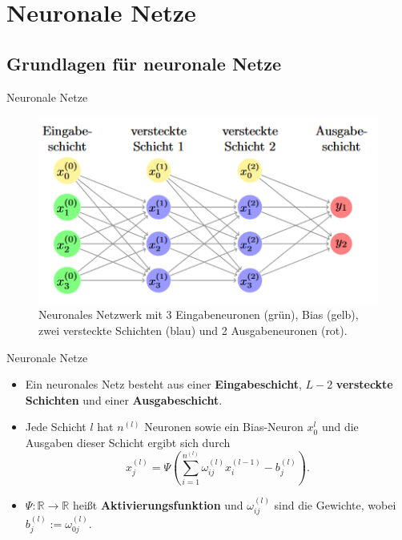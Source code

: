 \section{Neuronale Netze}

\subsection{Grundlagen für neuronale Netze}

\begin{frame}{Neuronale Netze}
    \begin{figure}[htp]
        \centering
        \includegraphics[scale=0.5]{images/neuralnet}
        \caption{Neuronales Netzwerk mit 3 Eingabeneuronen (grün), Bias (gelb), zwei versteckte Schichten
            (blau) und 2 Ausgabeneuronen (rot).}
        \label{neuralNetexample}
    \end{figure}
\end{frame}

\begin{frame}{Neuronale Netze}
    \begin{itemize}
        \item<1-> Ein neuronales Netz besteht aus einer \textbf{Eingabeschicht}, $L-2$ \textbf{versteckte Schichten} und
        einer \textbf{Ausgabeschicht}.
        \item<2-> Jede Schicht $l$ hat $n^{(l)}$ Neuronen sowie ein Bias-Neuron $x_0^{l}$ und die Ausgaben dieser
        Schicht ergibt sich durch
        \[
            x_j^{(l)} = \Psi \left( \sum_{i=1}^{n^{(l)}} \omega_{ij}^{(l)} x_i^{(l-1)} - b_j^{(l)} \right).
        \]
        \item<3-> $\Psi:\mathbb{R} \rightarrow \mathbb{R}$ heißt \textbf{Aktivierungsfunktion} und $\omega_{ij}^{(l)}$
        sind die Gewichte, wobei $b_j^{(l)}:= \omega_{0j}^{(l)}$.
    \end{itemize}
\end{frame}

